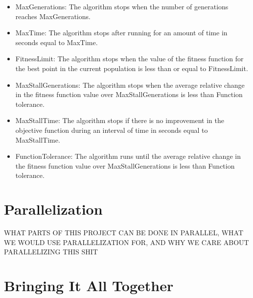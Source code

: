 \documentclass{article}
\renewcommand{\_}{\ifincsname_\else\legacyunderscore\fi}
\begin{document}
\begin{itemize}
    \item MaxGenerations: The algorithm stops when the number of generations reaches MaxGenerations.
    
    \item MaxTime: The algorithm stops after running for an amount of time in seconds equal to MaxTime.
    
    \item FitnessLimit: The algorithm stops when the value of the fitness function for the best point in the current population is less than or equal to FitnessLimit.
    
    \item MaxStallGenerations: The algorithm stops when the average relative change in the fitness function value over MaxStallGenerations is less than Function tolerance.
    
    \item MaxStallTime: The algorithm stops if there is no improvement in the objective function during an interval of time in seconds equal to MaxStallTime.
    
    \item FunctionTolerance: The algorithm runs until the average relative change in the fitness function value over MaxStallGenerations is less than Function tolerance.
\end{itemize}

\section*{Parallelization}
WHAT PARTS OF THIS PROJECT CAN BE DONE IN PARALLEL, WHAT WE WOULD USE PARALLELIZATION FOR, AND WHY WE CARE ABOUT PARALLELIZING THIS SHIT
\section*{Bringing It All Together}
\end{document}
